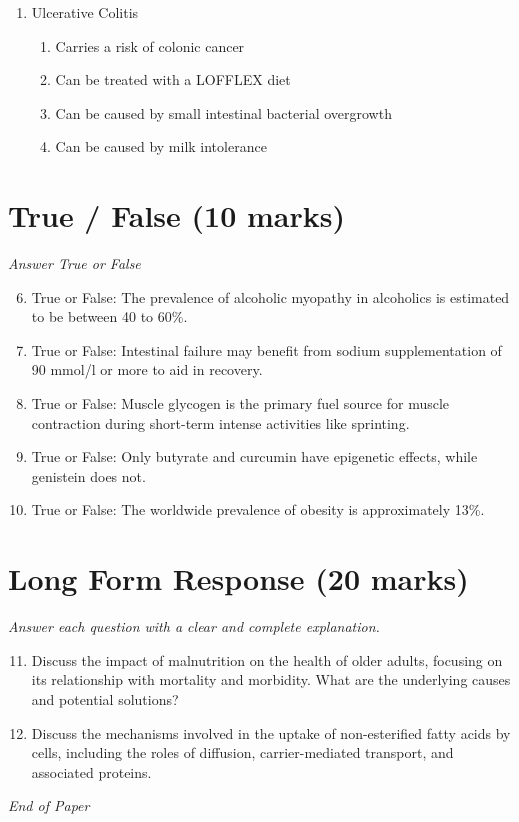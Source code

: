 \documentclass[12pt]{article}
\begin{document}
\begin{enumerate}[label=\arabic*.]
\begin{enumerate}[label=(\alph*)]
    \item Niacin
    \item Riboflavin
    \item Vitamin B 6
\end{enumerate}
\item Ulcerative Colitis
\begin{enumerate}[label=(\alph*)]
    \item Carries a risk of colonic cancer
    \item Can be treated with a LOFFLEX diet
    \item Can be caused by small intestinal bacterial overgrowth
    \item Can be caused by milk intolerance
\end{enumerate}
\end{enumerate}

\section*{True / False (10 marks)}
\textit{Answer True or False}
\begin{enumerate}[label=\arabic*.]
\setcounter{enumi}{5}
\item True or False: The prevalence of alcoholic myopathy in alcoholics is estimated to be between 40 to 60\%.
\item True or False: Intestinal failure may benefit from sodium supplementation of 90 mmol/l or more to aid in recovery.
\item True or False: Muscle glycogen is the primary fuel source for muscle contraction during short-term intense activities like sprinting.
\item True or False: Only butyrate and curcumin have epigenetic effects, while genistein does not.
\item True or False: The worldwide prevalence of obesity is approximately 13\%.
\end{enumerate}

\section*{Long Form Response (20 marks)}
\textit{Answer each question with a clear and complete explanation.}
\begin{enumerate}[label=\arabic*.]
\setcounter{enumi}{10}
\item Discuss the impact of malnutrition on the health of older adults, focusing on its relationship with mortality and morbidity. What are the underlying causes and potential solutions?
\item Discuss the mechanisms involved in the uptake of non-esterified fatty acids by cells, including the roles of diffusion, carrier-mediated transport, and associated proteins.
\end{enumerate}

\vfill
\noindent\textit{End of Paper}
\end{document}

